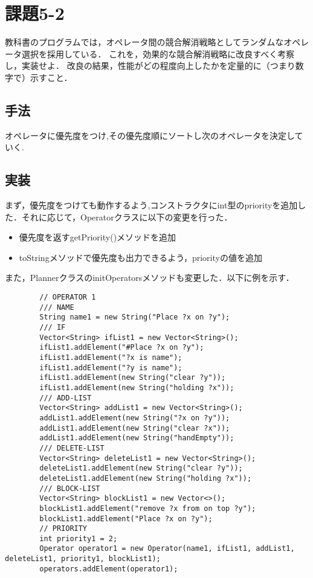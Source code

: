 \documentclass[a4j]{jarticle}
\begin{document}
\section{課題5-2}
\begin{screen}
教科書のプログラムでは，オペレータ間の競合解消戦略としてランダムなオペレータ選択を採用している．
これを，効果的な競合解消戦略に改良すべく考察し，実装せよ．
改良の結果，性能がどの程度向上したかを定量的に（つまり数字で）示すこと．
\end{screen}

\subsection{手法}
オペレータに優先度をつけ,その優先度順にソートし次のオペレータを決定していく.

\subsection{実装}
まず，優先度をつけても動作するよう,コンストラクタにint型のpriorityを追加した．それに応じて，Operatorクラスに以下の変更を行った．
\begin{itemize}
\item 優先度を返すgetPriority()メソッドを追加
\item toStringメソッドで優先度も出力できるよう，priorityの値を追加
\end{itemize}
また，PlannerクラスのinitOperatorsメソッドも変更した．以下に例を示す．
\begin{lstlisting}
		// OPERATOR 1
		/// NAME
		String name1 = new String("Place ?x on ?y");
		/// IF
		Vector<String> ifList1 = new Vector<String>();
		ifList1.addElement("#Place ?x on ?y");
		ifList1.addElement("?x is name");
		ifList1.addElement("?y is name");
		ifList1.addElement(new String("clear ?y"));
		ifList1.addElement(new String("holding ?x"));
		/// ADD-LIST
		Vector<String> addList1 = new Vector<String>();
		addList1.addElement(new String("?x on ?y"));
		addList1.addElement(new String("clear ?x"));
		addList1.addElement(new String("handEmpty"));
		/// DELETE-LIST
		Vector<String> deleteList1 = new Vector<String>();
		deleteList1.addElement(new String("clear ?y"));
		deleteList1.addElement(new String("holding ?x"));
		/// BLOCK-LIST
		Vector<String> blockList1 = new Vector<>();
		blockList1.addElement("remove ?x from on top ?y");
		blockList1.addElement("Place ?x on ?y");
		// PRIORITY
		int priority1 = 2;
		Operator operator1 = new Operator(name1, ifList1, addList1, deleteList1, priority1, blockList1);
		operators.addElement(operator1);
\end{lstlisting}
\end{document}
